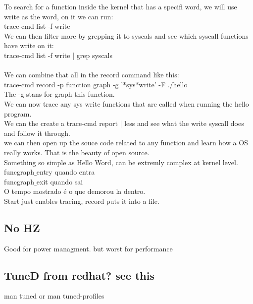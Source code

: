 \documentclass[11pt, a4paper, oneside]{article}
\theoremstyle{definition}
\begin{document}
To search for a function inside the kernel that has a specifi word, we will use write as the word, on it we can run:\\
trace-cmd list -f write\\
We can then filter more by grepping it to syscals and see which syscall functions have write on it:\\
trace-cmd list -f write | grep syscals\\
\\
We can combine that all in the record command like this:\\
trace-cmd record -p function$\_$graph -g '*sys*write' -F ./hello\\
The -g stans for graph this function.\\ 
We can now trace any sys write functions that are called when running the hello program.\\
We can the create a trace-cmd report | less and see what the write syscall does and follow it through.\\
we can then open up the souce code related to any function and learn how a OS really works. That is the beauty of open source.\\

Something so simple as Hello Word, can be extremly complex at kernel level.\\

funcgraph$\_$entry quando entra\\
funcgraph$\_$exit quando sai\\
O tempo mostrado é o que demorou la dentro.\\

Start just enables tracing, record puts it into a file.


\subsection{No HZ}

Good for power managment. but worst for performance\\


\vfill
\pagebreak
\subsection{TuneD from redhat? see this}

man tuned or man tuned-profiles
\end{document}
